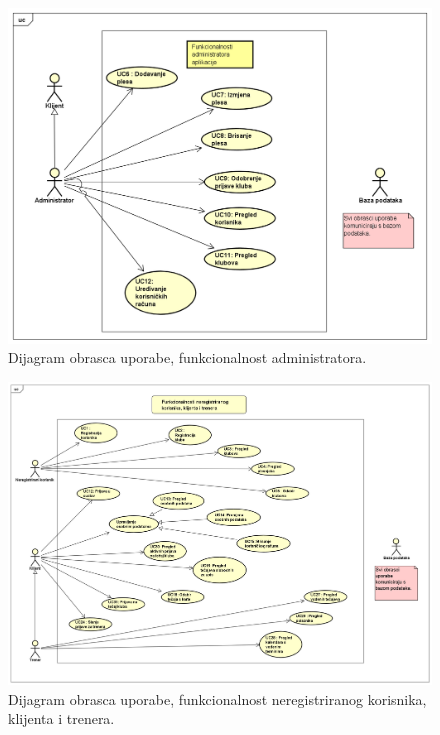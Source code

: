 		\begin{figure}[H]
			\includegraphics[scale=0.4]{slike/UC_admin.PNG} %
			\caption{Dijagram obrasca uporabe, funkcionalnost administratora.}
			\label{fig:UC_admin} %
		\end{figure}

		\begin{figure}[H]
			\includegraphics[scale=0.3]{slike/UC_Admin_client_unregistered.PNG} %
			\caption{Dijagram obrasca uporabe, funkcionalnost neregistriranog korisnika, klijenta i trenera.}
			\label{fig:UC_klijent_trener_neregistrirani} %
		\end{figure}
		
